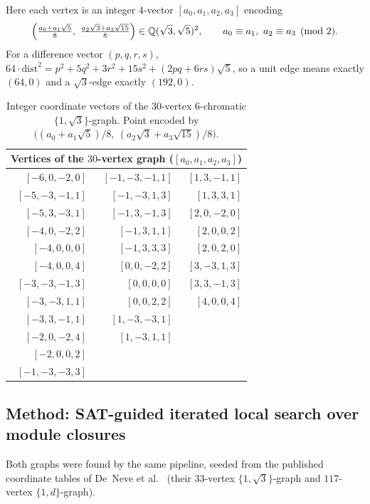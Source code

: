 \documentclass[11pt]{article}
\theoremstyle{definition}
\theoremstyle{remark}
\newcommand{\Q}{\mathbb{Q}}
\newcommand{\dd}{d}                          %
\begin{document}
Here each vertex is an integer $4$-vector $[a_0,a_1,a_2,a_3]$ encoding
\[
  \Bigl(\tfrac{a_0+a_1\sqrt5}{8},\ \tfrac{a_2\sqrt3+a_3\sqrt{15}}{8}\Bigr)
  \in\Q(\sqrt3,\sqrt5)^2,
  \qquad a_0\equiv a_1,\ a_2\equiv a_3 \pmod 2 .
\]
For a difference vector $(p,q,r,s)$,
$64\cdot\mathrm{dist}^2=p^2+5q^2+3r^2+15s^2+(2pq+6rs)\sqrt5$, so a unit
edge means exactly $(64,0)$ and a $\sqrt3$-edge exactly $(192,0)$.

\begin{table}[ht]
\centering\small
\begin{tabular}{@{}rrr@{}}
\toprule
\multicolumn{3}{c}{Vertices of the $30$-vertex graph
  ($[a_0,a_1,a_2,a_3]$)}\\
\midrule
$[-6,0,-2,0]$  & $[-1,-3,-1,1]$ & $[1,3,-1,1]$ \\
$[-5,-3,-1,1]$ & $[-1,-3,1,3]$  & $[1,3,3,1]$ \\
$[-5,3,-3,1]$  & $[-1,3,-1,3]$  & $[2,0,-2,0]$ \\
$[-4,0,-2,2]$  & $[-1,3,1,1]$   & $[2,0,0,2]$ \\
$[-4,0,0,0]$   & $[-1,3,3,3]$   & $[2,0,2,0]$ \\
$[-4,0,0,4]$   & $[0,0,-2,2]$   & $[3,-3,1,3]$ \\
$[-3,-3,-1,3]$ & $[0,0,0,0]$    & $[3,3,-1,3]$ \\
$[-3,-3,1,1]$  & $[0,0,2,2]$    & $[4,0,0,4]$ \\
$[-3,3,-1,1]$  & $[1,-3,-3,1]$  & \\
$[-2,0,-2,4]$  & $[1,-3,1,1]$   & \\
$[-2,0,0,2]$   & \\
$[-1,-3,-3,3]$ & \\
\bottomrule
\end{tabular}
\caption{Integer coordinate vectors of the $30$-vertex $6$-chromatic
$\{1,\sqrt3\}$-graph.  Point encoded by
$\bigl((a_0+a_1\sqrt5)/8,\ (a_2\sqrt3+a_3\sqrt{15})/8\bigr)$.}
\label{tab:g30}
\end{table}

\subsection{Method: SAT-guided iterated local search over module
closures}\label{sec:method}

Both graphs were found by the same pipeline, seeded from the published
coordinate tables of De~Neve et al.\ \cite{DeNeve25} (their $33$-vertex
$\{1,\sqrt3\}$-graph and $117$-vertex $\{1,\dd\}$-graph).
\end{document}
